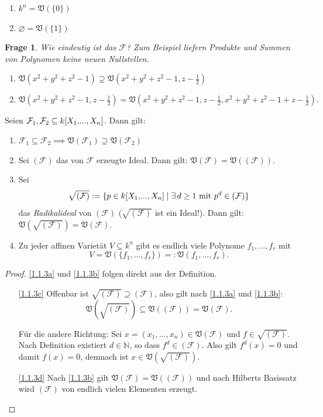 \documentclass[a4paper,12pt,index=toc]{scrbook}
\theoremstyle{keinenummern} %
\newtheorem{q}{Frage}
\def\V{\mathfrak{V}}
\newcommand{\F}{\mathcal{F}}
\newcommand{\leer}{\ensuremath{\varnothing}}
\renewcommand{\dotsc}{\ensuremath{\!...}}
\newcommand{\set}[1]{\ensuremath{\mathbb{#1}}}
\newcommand{\N}{\set{N}}
\newcommand{\polyx}[1][n]{\ensuremath%
  [X_{1},\dotsc,X_{#1}]}
\begin{document}
\begin{bsp}\label{bsp1.2}
\begin{enumerate}
\item $k^{n}=\V(\{0\})$
\item $\leer=\V(\{1\})$
\end{enumerate}
\end{bsp}

\begin{q}Wie eindeutig ist das $\F$? Zum Beispiel liefern Produkte und Summen von Polynomen keine neuen Nullstellen.
\end{q}

\begin{nbsp}\begin{enumerate}
\item $\V(x^{2}+y^{2}+z^{2}-1) \supsetneq \V(x^{2}+y^{2}+z^{2}-1, z-\frac{1}{2})$
\item $\V(x^{2}+y^{2}+z^{2}-1, z-\frac{1}{2}) = \V(x^{2}+y^{2}+z^{2}-1, z-\frac{1}{2}, x^{2}+y^{2}+z^{2}-1 + z-\frac{1}{2}).$
\end{enumerate}\end{nbsp}


\begin{bem}\label{1.1.3} Seien $\F_{1},\F_{2}\subseteq k\polyx$. Dann gilt:
\begin{enumerate}
\item{} $\F_{1}\subseteq\F_{2}\implies \V(\F_{1})\supseteq \V(\F_{2})$
\item{} Sei $(\F)$ das von $\F$ erzeugte Ideal. Dann gilt: $\V(\F) = \V((\F))$.
\item{} Sei
\[\sqrt{(\F)}:=\{p\in k\polyx\mid\exists\, d\geq 1\text{ mit }p^{d}\in(\F)\}\]
das \emph{Radikalideal} von $(\F)$ ($\sqrt{(\F)}$ ist ein Ideal!). Dann gilt: $\V(\sqrt{(\F)})=\V(\F)$.
\item{} Zu jeder affinen Varietät $V\subseteq k^{n}$ gibt es endlich viele Polynome $f_{1},\dotsc,f_{r}$ mit \[V=\V(\{f_{1},\dotsc,f_{r}\})=:\V(f_{1},\dotsc,f_{r}).\]
\end{enumerate}
\end{bem}

\begin{proof}\mbox{} %
\ref{1.1.3a} und \ref{1.1.3b} folgen direkt aus der Definition.
\begin{enumerate}%
\item[\ref{1.1.3c}] Offenbar ist $\sqrt{(\F)}\supseteq(\F)$, also gilt nach \ref{1.1.3a} und \ref{1.1.3b}: 
\[\V(\sqrt{(\F)})\subseteq \V((\F))=\V(\F).\]

Für die andere Richtung: Sei $x=(x_{1},\dotsc,x_{n})\in \V(\F)$ und $f\in\sqrt{(\F)}$. Nach Definition existiert $d\in\N$, so dass $f^{d}\in(\F)$. Also gilt $f^{d}(x)=0$ und damit $f(x)=0$, demnach ist $x\in \V(\sqrt{(\F)})$.
\item[\ref{1.1.3d}] Nach \ref{1.1.3b} gilt $\V(\F)=\V((\F))$ und nach Hilberts Basissatz wird $(\F)$ von endlich vielen Elementen erzeugt.
\end{enumerate}
\end{proof}
\end{document}

